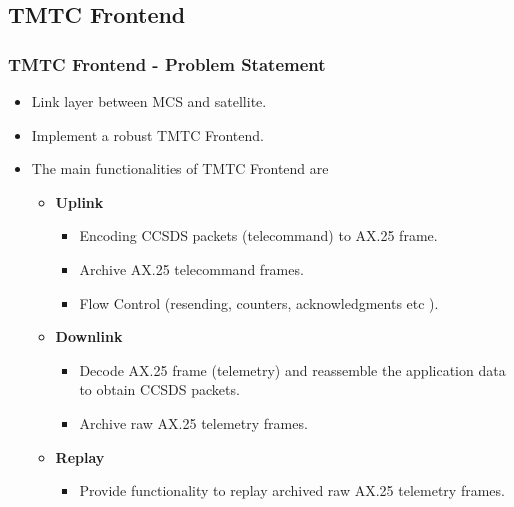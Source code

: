 \documentclass{beamer}
\begin{document}
\subsection{TMTC Frontend}
\begin{frame}
\frametitle{TMTC Frontend - Problem Statement}
\pause 
\begin{itemize}
\item Link layer between MCS and satellite.
\pause
\item Implement a robust TMTC Frontend.
\pause
\item The main functionalities of TMTC Frontend are 
\begin{itemize}
\item \textbf{Uplink}
\begin{itemize}
\item Encoding CCSDS packets (telecommand) to AX.25 frame.
\item Archive AX.25 telecommand frames.
\item Flow Control (resending, counters, acknowledgments etc ).
\end{itemize}
\item \textbf{Downlink}
\begin{itemize}
\item Decode AX.25 frame (telemetry) and reassemble the application data to
obtain CCSDS packets.
\item Archive raw AX.25 telemetry frames.

\end{itemize}

\item \textbf{Replay}
\begin{itemize}
\item Provide functionality to replay archived raw AX.25 telemetry frames.
\end{itemize}
\end{itemize}
\end{itemize}
\end{frame}
\end{document}
